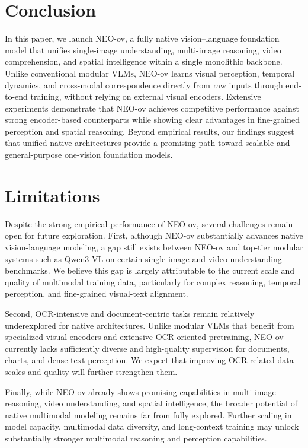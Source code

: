 \documentclass[11pt]{article}
\begin{document}
\section{Conclusion}

In this paper, we launch NEO-ov, a fully native vision–language foundation model that unifies single-image understanding, multi-image reasoning, video comprehension, and spatial intelligence within a single monolithic backbone. Unlike conventional modular VLMs, NEO-ov learns visual perception, temporal dynamics, and cross-modal correspondence directly from raw inputs through end-to-end training, without relying on external visual encoders.
%
Extensive experiments demonstrate that NEO-ov achieves competitive performance against strong encoder-based counterparts while showing clear advantages in fine-grained perception and spatial reasoning. Beyond empirical results, our findings suggest that unified native architectures provide a promising path toward scalable and general-purpose one-vision foundation models.

\section{Limitations}

Despite the strong empirical performance of NEO-ov, several challenges remain open for future exploration. First, although NEO-ov substantially advances native vision-language modeling, a gap still exists between NEO-ov and top-tier modular systems such as Qwen3-VL on certain single-image and video understanding benchmarks. We believe this gap is largely attributable to the current scale and quality of multimodal training data, particularly for complex reasoning, temporal perception, and fine-grained visual-text alignment.

Second, OCR-intensive and document-centric tasks remain relatively underexplored for native architectures. Unlike modular VLMs that benefit from specialized visual encoders and extensive OCR-oriented pretraining, NEO-ov currently lacks sufficiently diverse and high-quality supervision for documents, charts, and dense text perception. We expect that improving OCR-related data scales and quality will further strengthen them.

Finally, while NEO-ov already shows promising capabilities in multi-image reasoning, video understanding, and spatial intelligence, the broader potential of native multimodal modeling remains far from fully explored. Further scaling in model capacity, multimodal data diversity, and long-context training may unlock substantially stronger multimodal reasoning and perception capabilities.
\end{document}
